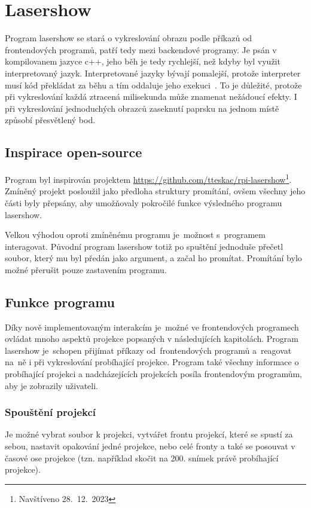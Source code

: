 \section{Lasershow}
Program lasershow se stará o vykreslování obrazu podle příkazů od frontendových programů, patří tedy mezi backendové programy.
Je psán v kompilovanem jazyce c++, jeho běh je tedy rychlejší, než kdyby byl využit interpretovaný jazyk.
Interpretované jazyky bývají pomalejší, protože interpreter musí kód překládat za běhu a tím oddaluje jeho exekuci~\cite{interpret}. To je důležité, protože při vykreslování každá ztracená milisekunda může znamenat nežádoucí efekty. I při vykreslování jednoduchých obrazců zaseknutí paprsku na jednom místě způsobí přesvětlený bod.

\subsection{Inspirace open-source}
Program byl inspirován projektem \url{https://github.com/tteskac/rpi-lasershow}\footnote{Navštíveno 28.~12.~2023}. Zmíněný projekt posloužil jako předloha struktury promítání, ovšem všechny jeho části byly přepsány, aby umožňovaly pokročilé funkce výsledného programu lasershow.

Velkou výhodou oproti zmíněnému programu je~možnost s~programem interagovat.
Původní program lasershow totiž po spuštění jednoduše přečetl soubor, který mu byl předán jako argument, a začal ho promítat. Promítání bylo možné přerušit pouze zastavením programu.

\subsection{Funkce programu}
Díky nově implementovaným interakcím je~možné ve frontendových programech ovládat mnoho aspektů projekce popsaných v následujících kapitolách. Program lasershow je~schopen přijímat příkazy od~frontendových programů a~reagovat na~ně i při vykreslování probíhající projekce. Program také všechny informace o probíhající projekci a nadcházejících projekcích posíla frontendovým programům, aby je zobrazily uživateli.

\subsubsection{Spouštění projekcí}
Je možné vybrat soubor k projekci, vytvářet frontu projekcí, které se spustí za sebou, nastavit opakování jedné projekce, nebo celé fronty a také se posouvat v časové ose projekce (tzn. například skočit na 200. snímek právě probíhající projekce).

